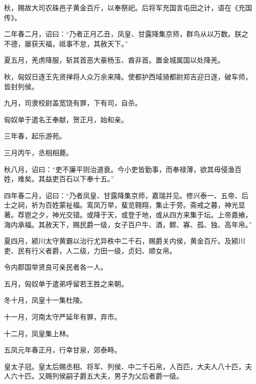 \documentclass[12pt,UTF8]{ctexbook}
\begin{document}
秋，赐故大司农硃邑子黄金百斤，以奉祭祀。后将军充国言屯田之计，语在《充国传》。



二年春二月，诏曰：“乃者正月乙丑，凤皇、甘露降集京师，群鸟从以万数。朕之不德，屡获天福，祗事不怠，其赦天下。”



夏五月，羌虏降服，斩其首恶大豪杨玉、酋非首。置金城属国以处降羌。



秋，匈奴日逐王先贤掸将人众万余来降。使都护西域骑都尉郑吉迎日逐，破车师，皆封列侯。



九月，司隶校尉盖宽饶有罪，下有司，自杀。



匈奴单于遣名王奉献，贺正月，始和亲。



三年春，起乐游苑。



三月丙午，丞相相薨。



秋八月，诏曰：“吏不廉平则治道衰。今小吏皆勤事，而奉禄薄，欲其毋侵渔百姓，难矣。其益吏百石以下奉十五。”



四年春二月，诏曰：“乃者凤皇、甘露降集京师，嘉瑞并见。修兴泰一、五帝、后士之祠，祈为百姓蒙祉福。鸾凤万举，蜚览翱翔，集止于旁。斋戒之暮，神光显著。荐鬯之夕，神光交错。或降于天，或登于地，或从四方来集于坛。上帝嘉飨，海内承福。其赦天下，赐民爵一级，女子百户牛、酒，鳏、寡、孤、独、高年帛。”



夏四月，颍川太守黄霸以治行尤异秩中二千石，赐爵关内侯，黄金百斤。及颍川吏、民有行义者爵，人二级，力田一级，贞妇、顺女帛。



令内郡国举贤良可亲民者各一人。



五月，匈奴单于遣弟呼留若王胜之来朝。



冬十月，凤皇十一集杜陵。



十一月，河南太守严延年有罪，弃市。



十二月，凤皇集上林。



五凤元年春正月，行幸甘泉，郊泰畤。



皇太子冠。皇太后赐丞相、将军、列侯、中二千石帛，人百匹，大夫人八十匹，夫人六十匹。又赐列侯嗣子爵五大夫，男子为父后者爵一级。
\end{document}
